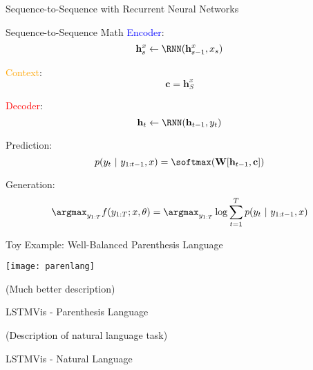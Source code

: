 \begin{frame}{Sequence-to-Sequence with Recurrent Neural Networks}
  \vspace{-0.25cm}

  \begin{center}
  \end{center}
\end{frame}


\begin{frame}{Sequence-to-Sequence Math}
  \textcolor{blue}{Encoder}:
  \[{\mathbf{h}^{x}_s \gets \RNN(\mathbf{h}^{x}_{s-1}, x_s)} \]

  \textcolor{orange}{Context}:
  \[ {\mathbf{c}} = \mathbf{h}^{x}_S \]

  \textcolor{red}{Decoder}:
  \[{\mathbf{h}_t \gets \RNN(\mathbf{h}_{t-1}, y_t)} \]

  Prediction:
  \[ p(y_{t}\  |\  y_{1:t-1}, x) = \softmax( \mathbf{W} [\mathbf{h}_{t-1}, \mathbf{c}]) \]

  \pause

  Generation:
  \[ \argmax_{y_{1:T}} f(y_{1:T}; x, \theta) = \argmax_{y_{1:T}} \log \sum_{t=1}^T p(y_{t}\  |\  y_{1:t-1}, x) \]

\end{frame}

\begin{frame}{Toy Example: Well-Balanced Parenthesis Language}
  \begin{center}
    \texttt{[image: parenlang]}
  \end{center}

  (Much better description)

\end{frame}

\begin{frame}{LSTMVis - Parenthesis Language}
  \vspace{-0.25cm}

  \begin{center}
  \end{center}
\end{frame}


\begin{frame}
  (Description of natural language task)
\end{frame}

\begin{frame}{LSTMVis - Natural Language}
  \vspace{-0.25cm}


  \begin{center}
  \end{center}
\end{frame}


